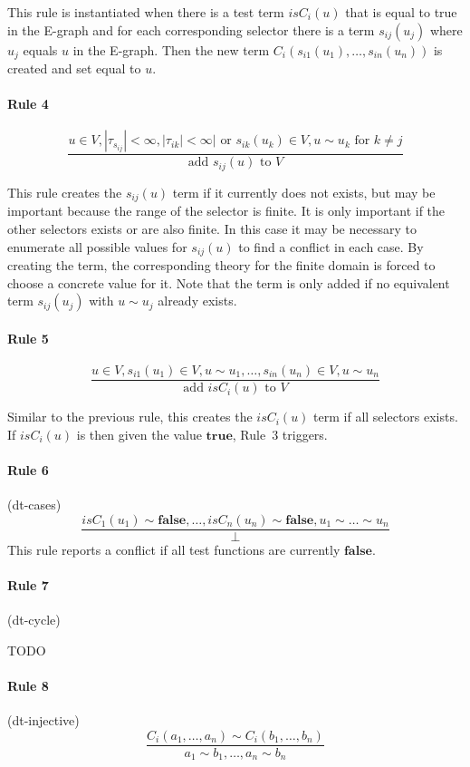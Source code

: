 \documentclass[a4paper]{article}
\newcommand\true{\mathbf{true}}
\newcommand\false{\mathbf{false}}
\newcommand\isC{\mathit{isC}}
\begin{document}
This rule is instantiated when there is a test term $\isC_i(u)$ that
is equal to true in the E-graph and for each corresponding selector there
is a term $s_{ij}(u_j)$ where $u_j$ equals $u$ in the E-graph.
Then the new term $C_i(s_{i1}(u_1),\dots,s_{in}(u_n))$ is created and set
equal to $u$.

\paragraph{Rule 4}
\[
\frac{u \in V, |\tau_{s_{ij}}| < \infty,
  |\tau_{ik}| < \infty|\text{ or }s_{ik}(u_k)\in V, u\sim u_k 
  \text{ for }k\neq j}
     {\text{add $s_{ij}(u)$ to $V$}}
\]

This rule creates the $s_{ij}(u)$ term if it currently does not
exists, but may be important because the range of the selector is
finite.  It is only important if the other selectors exists or are
also finite.  In this case it may be necessary to enumerate all
possible values for $s_{ij}(u)$ to find a conflict in each case.  By
creating the term, the corresponding theory for the finite domain is
forced to choose a concrete value for it.  Note that the term is only
added if no equivalent term $s_{ij}(u_j)$ with $u\sim u_j$ already
exists.

\paragraph{Rule 5}
\[
\frac{u \in V, s_{i1}(u_1)\in V,u\sim u_1,\dots, s_{in}(u_n)\in V, u\sim u_n}{\text{add $\isC_i(u)$ to $V$}}
\]

Similar to the previous rule, this creates the $\isC_i(u)$ term if all
selectors exists.  If $\isC_i(u)$ is then given the value $\true$,
Rule~3 triggers.


\paragraph{Rule 6} (dt-cases)
\[
\frac{\isC_1(u_1)\sim \false,\dots, \isC_n(u_n)\sim \false, u_1\sim\dots\sim u_n}{\bot}
\]
This rule reports a conflict if all test functions are currently $\false$.

\paragraph{Rule 7} (dt-cycle)

TODO

\paragraph{Rule 8} (dt-injective)
\[
\frac{C_i(a_1,\dots,a_n) \sim C_i(b_1,\dots,b_n)}{a_1 \sim b_1,\dots, a_n\sim b_n}
\]
\end{document}

